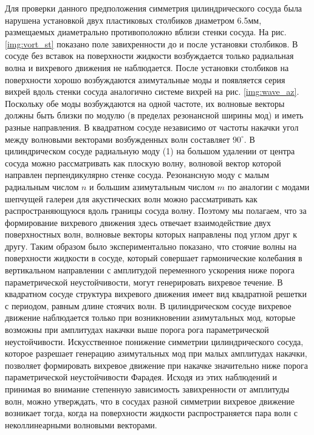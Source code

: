 Для проверки данного предположения симметрия цилиндрического сосуда была нарушена установкой двух пластиковых столбиков диаметром 6.5мм, размещаемых диаметрально противоположно вблизи стенки сосуда. На рис. \ref{img:vort_st} показано поле завихренности до и после установки столбиков. В сосуде без вставок на поверхности жидкости возбуждается только радиальная волна и вихревого движения не наблюдается. После установки столбиков на поверхности хорошо возбуждаются азимутальные моды и появляется серия вихрей вдоль стенки сосуда аналогично системе вихрей на рис. \ref{img:wave_az}. Поскольку обе моды возбуждаются на одной частоте, их волновые векторы должны быть близки по модулю (в пределах резонансной ширины мод) и иметь разные направления. В квадратном сосуде независимо от частоты накачки угол между волновыми векторами возбужденных волн составляет $90^\circ$. В цилиндрическом сосуде радиальную моду (1) на большом удалении от центра сосуда можно рассматривать как плоскую волну, волновой вектор которой направлен перпендикулярно стенке сосуда. Резонансную моду с малым радиальным числом $n$ и большим азимутальным числом $m$ по аналогии с модами шепчущей галереи для акустических волн можно рассматривать как распространяющуюся вдоль границы сосуда волну. Поэтому мы полагаем, что за формирование вихревого движения здесь отвечает взаимодействие двух поверхностных волн, волновые векторы которых направлены под углом друг к другу.
Таким образом было экспериментально показано, что стоячие волны на поверхности жидкости в сосуде, который совершает гармонические колебания в вертикальном направлении с амплитудой переменного ускорения ниже порога параметрической неустойчивости, могут генерировать вихревое течение. В квадратном сосуде структура вихревого движения имеет вид квадратной решетки с периодом, равным длине стоячих волн. В цилиндрическом сосуде вихревое движение наблюдается только при возникновении азимутальных мод, которые возможны при амплитудах накачки выше порога рога параметрической неустойчивости. Искусственное понижение симметрии цилиндрического сосуда, которое разрешает генерацию азимутальных мод при малых амплитудах накачки, позволяет формировать вихревое движение при накачке значительно ниже порога параметрической неустойчивости Фарадея. Исходя из этих наблюдений и принимая во внимание степенную зависимость завихренности от амплитуды волн, можно утверждать, что в сосудах разной симметрии вихревое движение возникает тогда, когда на поверхности жидкости распространяется пара волн с неколлинеарными волновыми векторами.


